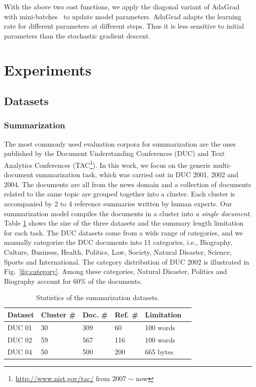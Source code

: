 \documentclass[letterpaper]{article}
\begin{document}
With the above two cost functions, we apply the diagonal variant of AdaGrad with mini-batches~\cite{duchi2011adaptive} to update model parameters.
AdaGrad adapts the learning rate for different parameters at different steps.
Thus it is less sensitive to initial parameters than the stochastic gradient descent.


\section{Experiments}
\subsection{Datasets} \label{SC:dataset}
\subsubsection{Summarization}
The most commonly used evaluation corpora for summarization are the ones published by the Document Understanding Conferences (DUC) and Text Analytics Conferences (TAC\footnote{\url{http://www.nist.gov/tac/} from 2007 $\sim$ now}).
In this work, we focus on the generic multi-document summarization task, which was carried out in DUC 2001, 2002 and 2004.
The documents are all from the news domain and a collection of documents related to the same topic are grouped together into a cluster.
Each cluster is accompanied by 2 to 4 reference summaries written by human experts.
Our summarization model compiles the documents in a cluster into \textit{a single document}.
Table \ref{TB:dataset} shows the size of the three datasets and the summary length limitation for each task.
The DUC datasets come from a wide range of categories, and we manually categorize the DUC documents into 11 categories, i.e., Biography, Culture, Business, Health, Politics, Law, Society, Natural Disaster, Science, Sports and International.
The category distribution of DUC 2002 is illustrated in Fig.~\ref{fig:category}.
Among these categories, Natural Disaster, Politics and Biography account for 60\% of the documents.



\begin{table}[ht]
	\centering
	\small
	\begin{tabular}{l|lllll}
		\hline
		Dataset & Cluster \# & Doc. \#  & Ref. \#  &Limitation\\ \hline
		DUC 01  & 30         & 309                & 60    & 100 words       \\ \hline
		DUC 02  & 59         & 567                 & 116   &100 words       \\ \hline
		DUC 04  & 50         & 500                & 200    &665 bytes      \\ \hline
	\end{tabular}
	\caption{Statistics of the summarization datasets.}
	\label{TB:dataset}
\end{table}
\end{document}
